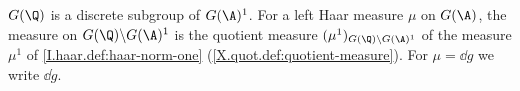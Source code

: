 $G(\Q)$ is a discrete subgroup of $G(\A)^1$. For a left Haar measure $\mu$ on $G(\A)$, the measure on
$G(\Q)\backslash G(\A)^1$ is the quotient measure $(\mu^1)_{G(\Q)\backslash G(\A)^1}$ of the measure $\mu^1$ of
\cref{I.haar.def:haar-norm-one} (\cref{X.quot.def:quotient-measure}). For $\mu=\dd g$ we write $\dd\dot g$.
